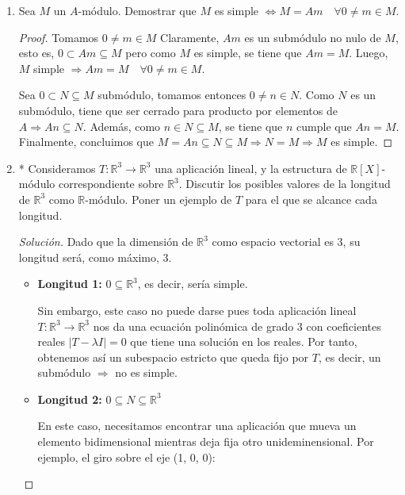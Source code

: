 \documentclass[paper=a4, fontsize=11pt, spanish]{scrartcl}
\begin{document}
\begin{enumerate}
\begin{proof}[Solución]
			Por lo que, finalmente, hemos demostrado que $Z(M_n(K)) = \{kI_n: k \in K\}$.
		\end{proof}
		
		\item Sea $M$ un $A$-módulo. Demostrar que $M$ es simple $\Leftrightarrow M = Am \quad \forall 0 \neq m
		\in M$.
		\begin{proof}
			\fbox{$\Rightarrow$} Tomamos $0 \neq m \in M$ Claramente, $Am$ es un submódulo no nulo de $M$, esto
			es, $0 \subset Am \subseteq M$ pero como $M$ es simple, se tiene que $Am = M$. Luego, $M$ simple
			$\Rightarrow Am = M \quad \forall 0 \neq m \in M$.
			
			\fbox{$\Leftarrow$} Sea $0 \subset N \subseteq M$ submódulo, tomamos entonces $0 \neq n \in N$.
			Como $N$ es un submódulo, tiene que ser cerrado para producto por elementos de $A \Rightarrow An
			\subseteq N$. Además, como $n \in N \subseteq M$, se tiene que $n$ cumple que $An = M$. Finalmente,
			concluimos que $M = An \subseteq N \subseteq M \Rightarrow N = M \Rightarrow M$ es simple.
		\end{proof}
		
		\item * Consideramos $T: \mathbb{R}^3 \rightarrow \mathbb{R}^3$ una aplicación lineal, y la estructura
		de $\mathbb{R}[X]$-módulo correspondiente sobre $\mathbb{R}^3$. Discutir los posibles valores de la
		longitud de $\mathbb{R}^3$ como $\mathbb{R}$-módulo. Poner un ejemplo de $T$ para el que se alcance
		cada longitud.
		\begin{proof}[Solución]
			Dado que la dimensión de $\mathbb{R}^3$ como espacio vectorial es 3, su longitud será, como máximo, 3.
			
			\begin{itemize}
				\item \textbf{Longitud 1:} $0 \subseteq \mathbb{R}^3$, es decir, sería simple.
				
				Sin embargo, este caso no puede darse pues toda aplicación lineal $T: \mathbb{R}^3 \rightarrow
				\mathbb{R}^3$ nos da una ecuación polinómica de grado 3 con coeficientes reales $|T - \lambda I|
				= 0$ que tiene una solución en los reales. Por tanto, obtenemos así un subespacio estricto que
				queda fijo por $T$, es decir, un submódulo $\Rightarrow$ no es simple.
				
				\item \textbf{Longitud 2:} $0 \subseteq N \subseteq \mathbb{R}^3$
				
				En este caso, necesitamos encontrar una aplicación que mueva un elemento bidimensional mientras
				deja fija otro unideminensional. Por ejemplo, el giro sobre el eje (1, 0, 0):
				

\end{itemize}
\end{proof}
\end{enumerate}
\end{document}
